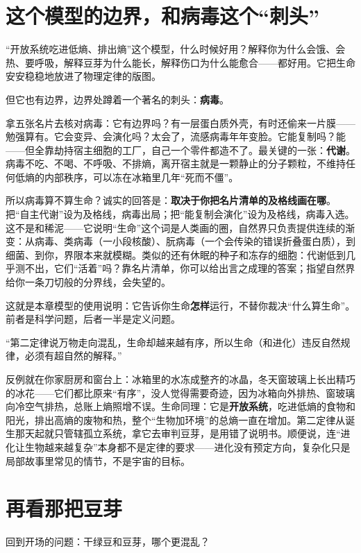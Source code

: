\section{这个模型的边界，和病毒这个“刺头”}

“开放系统吃进低熵、排出熵”这个模型，什么时候好用？解释你为什么会饿、会热、要呼吸，解释豆芽为什么能长，解释伤口为什么能愈合——都好用。它把生命安安稳稳地放进了物理定律的版图。

但它也有边界，边界处蹲着一个著名的刺头：\textbf{病毒}。

拿五张名片去核对病毒：它有边界吗？有一层蛋白质外壳，有时还偷来一片膜——勉强算有。它会变异、会演化吗？太会了，流感病毒年年变脸。它能复制吗？能——但全靠劫持宿主细胞的工厂，自己一个零件都造不了。最关键的一张：\textbf{代谢}。病毒不吃、不喝、不呼吸、不排熵，离开宿主就是一颗静止的分子颗粒，不维持任何低熵的内部秩序，可以冻在冰箱里几年“死而不僵”。

所以病毒算不算生命？诚实的回答是：\textbf{取决于你把名片清单的及格线画在哪}。把“自主代谢”设为及格线，病毒出局；把“能复制会演化”设为及格线，病毒入选。这不是和稀泥——它说明“生命”这个词是人类画的圈，自然界只负责提供连续的渐变：从病毒、类病毒（一小段核酸）、朊病毒（一个会传染的错误折叠蛋白质），到细菌、到你，界限本来就模糊。类似的还有休眠的种子和冻存的细胞：代谢低到几乎测不出，它们“活着”吗？靠名片清单，你可以给出言之成理的答案；指望自然界给你一条刀切般的分界线，会失望的。

这就是本章模型的使用说明：它告诉你生命\textbf{怎样}运行，不替你裁决“什么算生命”。前者是科学问题，后者一半是定义问题。

\begin{wuqu}
“第二定律说万物走向混乱，生命却越来越有序，所以生命（和进化）违反自然规律，必须有超自然的解释。”

反例就在你家厨房和窗台上：冰箱里的水冻成整齐的冰晶，冬天窗玻璃上长出精巧的冰花——它们都比原来“有序”，没人觉得需要奇迹，因为冰箱向外排热、窗玻璃向冷空气排热，总账上熵照增不误。生命同理：它是\textbf{开放系统}，吃进低熵的食物和阳光，排出高熵的废物和热，整个“生物加环境”的总熵一直在增加。第二定律从诞生那天起就只管辖孤立系统，拿它去审判豆芽，是用错了说明书。顺便说，连“进化让生物越来越复杂”本身都不是定律的要求——进化没有预定方向，复杂化只是局部故事里常见的情节，不是宇宙的目标。
\end{wuqu}

\section{再看那把豆芽}

回到开场的问题：干绿豆和豆芽，哪个更混乱？

